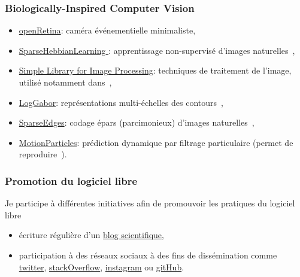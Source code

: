 \documentclass[10pt,french,a4paper,oneside]{article}%
\begin{document}
\subsubsection{Biologically-Inspired Computer Vision} %
\begin{itemize}
	\item \href{https://github.com/laurentperrinet/openRetina}{openRetina}: caméra événementielle minimaliste,
	\item \href{http://github.com/bicv/SparseHebbianLearning }{SparseHebbianLearning }: apprentissage non-supervisé d'images naturelles~\citep{Perrinet10shl,Perrinet19hulk},
	\item \href{http://github.com/bicv/SLIP}{Simple Library for Image Processing}: techniques de traitement de l'image, utilisé notamment dans~\citep{Perrinet15bicv,Ravello16droplets,PerrinetBednar15,Perrinet15eusipco,Perrinet16EUVIP},
	\item \href{http://github.com/bicv/LogGabor}{LogGabor}: représentations multi-échelles des contours~\citep{Fischer07,Fischer07cv},
	\item \href{http://github.com/bicv/SparseEdges}{SparseEdges}: codage épars (parcimonieux) d'images naturelles~\citep{Perrinet15bicv,PerrinetBednar15},
	\item \href{https://github.com/laurentperrinet/Khoei_2017_PLoSCB}{MotionParticles}: prédiction dynamique par filtrage particulaire (permet de reproduire~\citep{Perrinet12pred,Khoei13jpp,KhoeiMassonPerrinet17}).
\end{itemize}

\subsubsection{Promotion du logiciel libre} %
Je participe à différentes initiatives afin de promouvoir les pratiques du logiciel libre
\begin{itemize}
	\item écriture régulière d'un \href{https://laurentperrinet.github.io/sciblog/}{blog scientifique},
	\item participation à des réseaux sociaux à des fins de dissémination comme \href{https://twitter.com/laurentperrinet}{twitter}, \href{https://stackoverflow.com/users/234547/meduz}{stackOverflow}, \href{https://www.instagram.com/laurentperrinet/}{instagram} ou \href{https://github.com/laurentperrinet}{gitHub}.
\end{itemize}
\end{document}
